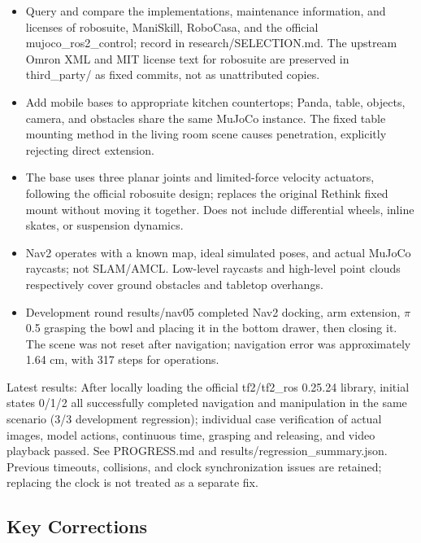 \begin{itemize}
\tightlist
\item
  Query and compare the implementations, maintenance information, and licenses of robosuite, ManiSkill, RoboCasa, and the official mujoco\_ros2\_control; record in research/SELECTION.md. The upstream Omron XML and MIT license text for robosuite are preserved in third\_party/ as fixed commits, not as unattributed copies.
\item
  Add mobile bases to appropriate kitchen countertops; Panda, table, objects, camera, and obstacles share the same MuJoCo instance. The fixed table mounting method in the living room scene causes penetration, explicitly rejecting direct extension.
\item
  The base uses three planar joints and limited-force velocity actuators, following the official robosuite design; replaces the original Rethink fixed mount without moving it together. Does not include differential wheels, inline skates, or suspension dynamics.
\item
  Nav2 operates with a known map, ideal simulated poses, and actual MuJoCo raycasts; not SLAM/AMCL. Low-level raycasts and high-level point clouds respectively cover ground obstacles and tabletop overhangs.
\item
  Development round results/nav05 completed Nav2 docking, arm extension, \(\pi\)0.5 grasping the bowl and placing it in the bottom drawer, then closing it. The scene was not reset after navigation; navigation error was approximately 1.64 cm, with 317 steps for operations.
\end{itemize}

Latest results: After locally loading the official tf2/tf2\_ros 0.25.24 library, initial states 0/1/2 all successfully completed navigation and manipulation in the same scenario (3/3 development regression); individual case verification of actual images, model actions, continuous time, grasping and releasing, and video playback passed. See PROGRESS.md and results/regression\_summary.json. Previous timeouts, collisions, and clock synchronization issues are retained; replacing the clock is not treated as a separate fix.

\subsection{Key Corrections}\label{s15-detail-2}

